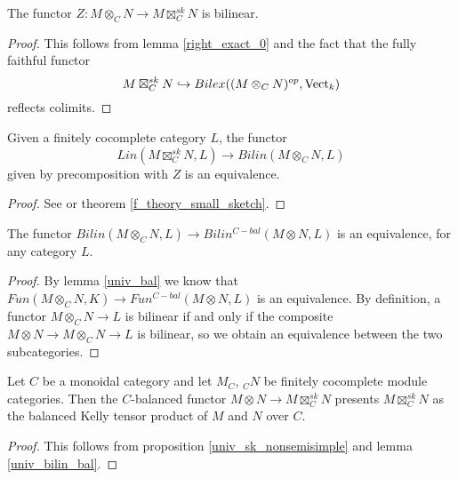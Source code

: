 \begin{lemma}\label{right_exact}
  The functor $Z:M\otimes_C N \to M\boxtimes_C^{sk}N$ is bilinear.
\end{lemma}

\begin{proof}
  This follows from lemma \ref{right_exact_0} and the fact that the fully
  faithful functor $$M\boxtimes_C^{sk}N\hookrightarrow Bilex((M\otimes_C
  N)^{op},\operatorname{Vect}_k)$$ reflects colimits.
\end{proof}

\begin{proposition}\label{univ_sk_nonsemisimple}

  \noindent Given a finitely cocomplete category $L$, the
  functor $$Lin(M\boxtimes_C^{sk}N,L)\to Bilin(M\otimes_C N, L)$$ given by
  precomposition with $Z$ is an equivalence.
\end{proposition}

\begin{proof}
  See \cite[theorem 6.23]{kelly/basic-concepts-enriched} or theorem
  \ref{f_theory_small_sketch}.
\end{proof}

\begin{lemma}\label{univ_bilin_bal}

  \noindent The functor $Bilin(M\otimes_C N,L)\to Bilin^{C-bal}(M\otimes N,
  L)$ is an equivalence, for any category $L$.
\end{lemma}

\begin{proof}
By lemma \ref{univ_bal} we know that $Fun(M\otimes_C N,K)\to
Fun^{C-bal}(M\otimes N, L)$ is an equivalence. By definition, a functor
$M\otimes_C N\to L$ is bilinear if and only if the composite $M\otimes N\to
M\otimes_C N\to L$ is bilinear, so we obtain an equivalence between the two
subcategories.
\end{proof}

\begin{theorem}\label{main_nonsemisimple}

  \noindent Let $C$ be a monoidal category and let $M_C$, $_{C}N$ be finitely
  cocomplete module categories. Then the $C$-balanced functor $M\otimes N\to
  M\boxtimes_C^{sk}N$ presents $M\boxtimes_C^{sk}N$ as the balanced Kelly
  tensor product of $M$ and $N$ over $C$.
\end{theorem}

\begin{proof}

This follows from proposition \ref{univ_sk_nonsemisimple} and lemma
\ref{univ_bilin_bal}.
\end{proof}


